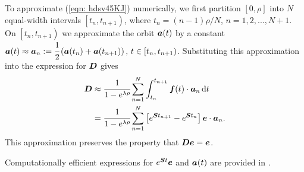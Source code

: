 To approximate (\ref{eqn: hdsv45KJ}) numerically, we first partition \(\left[0,\rho \right]\) into \(N\) equal-width intervals \(\left[t_n,t_{n+1}\right)\), where \(t_n = (n-1)\rho /N\), \(n=1,2,...,N+1\). On \(\left[t_n,t_{n+1}\right)\) we approximate the orbit \(\boldsymbol a(t)\) by a constant \(\boldsymbol a(t) \approx \boldsymbol a_n := \cfrac{1}{2}\left( \boldsymbol a(t_n) + \boldsymbol a(t_{n+1}) \right), \, t \in \left[t_n,t_{n+1}\right)\). Substituting this approximation into the expression for \(\boldsymbol{D}\) gives 
\begin{align*}
	\boldsymbol{D} &\approx \cfrac{1}{1 - e^{\lambda \rho }}\sum_{n=1}^N\int_{t_n}^{t_{n+1}} \boldsymbol f(t)\cdot\boldsymbol a_n\, \mathrm{d} t
	\\&=\cfrac{1}{1 - e^{\lambda \rho }}\sum_{n=1}^N\left[e^{\boldsymbol{S}t_{n+1}}-e^{\boldsymbol{S}t_{n}}\right]\boldsymbol e \cdot\boldsymbol a_n.
\end{align*}
This approximation preserves the property that \(\boldsymbol{D}\boldsymbol e = \boldsymbol e\). 

Computationally efficient expressions for \(e^{\boldsymbol{S}t}\boldsymbol e\) and \(\boldsymbol a(t)\) are provided in \citep{hhat2020}. 

